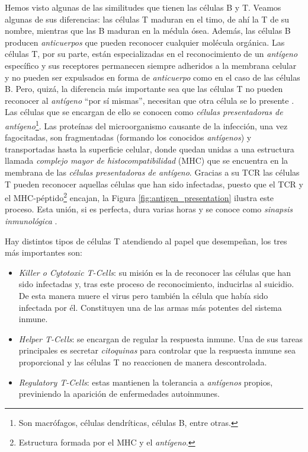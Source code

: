 Hemos visto algunas de las similitudes que tienen las células B y T. Veamos algunas de sus diferencias: las células T maduran en el timo, de ahí la T de su nombre, mientras que las B maduran en la médula ósea. Además, las células B producen \textit{anticuerpos} que pueden reconocer cualquier molécula orgánica. Las células T, por su parte, están especializadas en el reconocimiento de un \textit{antígeno} específico y sus receptores permanecen siempre adheridos a la membrana celular y no pueden ser expulsados en forma de \textit{anticuerpo} como en el caso de las células B. Pero, quizá, la diferencia más importante sea que las células T no pueden reconocer al \textit{antígeno} ``por sí mismas'', necesitan que otra célula se lo presente \citep{theHowItWorks}. Las células que se encargan de ello se conocen como \textit{células presentadoras de antígeno}\footnote{Son macrófagos, células dendríticas, células B, entre otras.}. Las proteínas del microorganismo causante de la infección, una vez fagocitadas, son fragmentadas (formando los conocidos \textit{antígenos}) y transportadas hasta la superficie celular, donde quedan unidas a una estructura llamada \textit{complejo mayor de histocompatibilidad} (MHC) que se encuentra en la membrana de las \textit{células presentadoras de antígeno}. Gracias a su TCR las células T pueden reconocer aquellas células que han sido infectadas, puesto que el TCR y el MHC-péptido\footnote{Estructura formada por el MHC y el \textit{antígeno}.} encajan, la Figura \ref{fig:antigen_presentation} ilustra este proceso. Esta unión, si es perfecta, dura varias horas y se conoce como \textit{sinapsis inmunológica} \citep{fernandez2012mecanica}.



Hay distintos tipos de células T atendiendo al papel que desempeñan, los tres más importantes son: 
\begin{itemize}
	\item \textit{Killer o Cytotoxic T-Cells}: su misión es la de reconocer las células que han sido infectadas y, tras este proceso de reconocimiento, inducirlas al suicidio. De esta manera muere el virus pero también la célula que había sido infectada por él. Constituyen una de las armas más potentes del sistema inmune.
	
	\item \textit{Helper T-Cells}: se encargan de regular la respuesta inmune. Una de sus tareas principales es secretar \textit{citoquinas} para controlar que la respuesta inmune sea proporcional y las células T no reaccionen de manera descontrolada.
	
	\item \textit{Regulatory T-Cells}: estas mantienen la tolerancia a \textit{antígenos} propios, previniendo la aparición de enfermedades autoinmunes.
\end{itemize}



